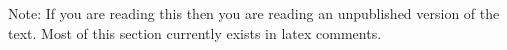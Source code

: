 Note: If you are reading this then you are reading an unpublished version of the text. Most of this section currently exists in latex comments.


